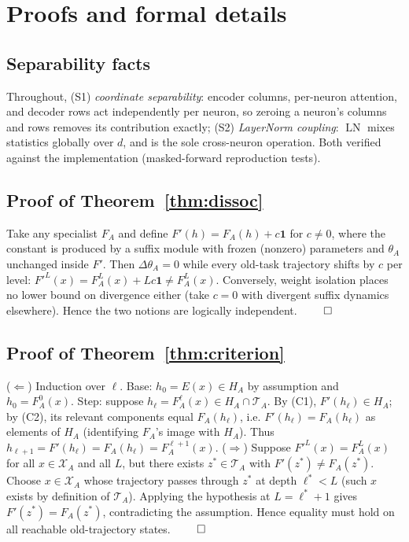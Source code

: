 \documentclass[11pt]{article}
\theoremstyle{definition}\newtheorem{definition}{Definition}
\theoremstyle{remark}\newtheorem{remark}{Remark}
\newcommand{\Xa}{\mathcal{X}_A}
\newcommand{\TA}{\mathcal{T}_A}
\begin{document}
\appendix

\section{Proofs and formal details}\label{app:proofs}

\subsection{Separability facts}
Throughout, (S1) \emph{coordinate separability}: encoder columns, per-neuron attention, and
decoder rows act independently per neuron, so zeroing a neuron's columns and rows removes
its contribution exactly; (S2) \emph{LayerNorm coupling}: $\operatorname{LN}$ mixes
statistics globally over $d$, and is the sole cross-neuron operation. Both verified against
the implementation (masked-forward reproduction tests).

\subsection{Proof of Theorem~\ref{thm:dissoc}}
Take any specialist $F_A$ and define $F'(h)=F_A(h)+c\mathbf{1}$ for $c\neq0$, where the
constant is produced by a suffix module with frozen (nonzero) parameters and $\theta_A$
unchanged inside $F'$. Then $\Delta\theta_A=0$ while every old-task trajectory shifts by
$c$ per level: $F'^L(x)=F_A^L(x)+Lc\mathbf{1}\neq F_A^L(x)$. Conversely, weight isolation
places no lower bound on divergence either (take $c=0$ with divergent suffix dynamics
elsewhere). Hence the two notions are logically independent. \hfill$\qed$

\subsection{Proof of Theorem~\ref{thm:criterion}}
($\Leftarrow$) Induction over $\ell$. Base: $h_0=E(x)\in H_A$ by assumption and
$h_0=F_A^0(x)$. Step: suppose $h_\ell=F_A^\ell(x)\in H_A\cap\TA$. By (C1),
$F'(h_\ell)\in H_A$; by (C2), its relevant components equal $F_A(h_\ell)$, i.e.
$F'(h_\ell)=F_A(h_\ell)$ as elements of $H_A$ (identifying $F_A$'s image with $H_A$).
Thus $h_{\ell+1}=F'(h_\ell)=F_A(h_\ell)=F_A^{\ell+1}(x)$.
($\Rightarrow$) Suppose $F'^L(x)=F_A^L(x)$ for all $x\in\Xa$ and all $L$, but there exists
$z^*\in\TA$ with $F'(z^*)\neq F_A(z^*)$. Choose $x\in\Xa$ whose trajectory passes through
$z^*$ at depth $\ell^*<L$ (such $x$ exists by definition of $\TA$). Applying the hypothesis
at $L=\ell^*+1$ gives $F'(z^*)=F_A(z^*)$, contradicting the assumption. Hence equality must
hold on all reachable old-trajectory states. \hfill$\qed$
\end{document}
